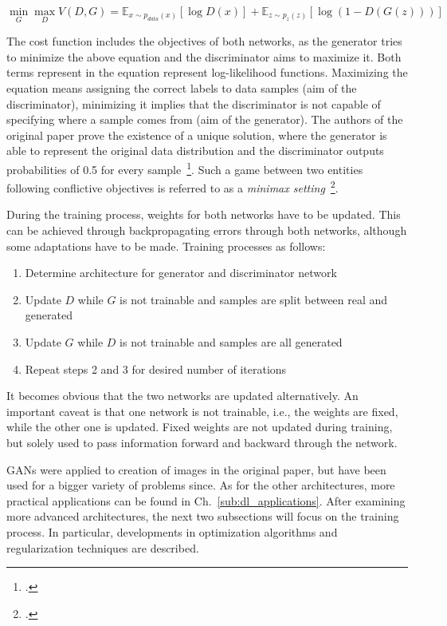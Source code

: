 \begin{equation}
  \label{eq:gan_obj}
  \min_G \max_D V(D, G) = \mathbb{E}_{x \sim p_{data}(x)}[\log D(x)] + \mathbb{E}_{z \sim p_z (z)}[\log (1 - D(G(z)))]
\end{equation}

The cost function includes the objectives of both networks, as the generator
tries to minimize the above equation and the discriminator aims to maximize it.
Both terms represent in the equation represent log-likelihood functions.
Maximizing the equation means assigning the correct labels to data samples (aim
of the discriminator), minimizing it implies that the discriminator is not capable
of specifying where a sample comes from (aim of the generator).
The authors of the original paper prove the existence of a unique solution, where
the generator is able to represent the original data distribution and the 
discriminator outputs probabilities of 0.5 for every sample~\footcite{Goodfellow2014}.
Such a game between two entities following conflictive objectives is referred to
as a \textit{minimax setting}~\footcite{Russell1995}.

During the training process, weights for both networks have to be updated.
This can be achieved through backpropagating errors through both networks,
although some adaptations have to be made.
Training processes as follows:

\begin{enumerate}
  \item Determine architecture for generator and discriminator network
  \item Update $D$ while $G$ is not trainable and samples are split between real and generated
  \item Update $G$ while $D$ is not trainable and samples are all generated
  \item Repeat steps 2 and 3 for desired number of iterations
\end{enumerate}

It becomes obvious that the two networks are updated alternatively.
An important caveat is that one network is not trainable, i.e., the weights are
fixed, while the other one is updated.
Fixed weights are not updated during training, but solely used to pass information
forward and backward through the network.

GANs were applied to creation of images in the original paper, but have been
used for a bigger variety of problems since. As for the other architectures,
more practical applications can be found in Ch.~\ref{sub:dl_applications}.
After examining more advanced architectures, the next two subsections will
focus on the training process.
In particular, developments in optimization algorithms and regularization
techniques are described.

